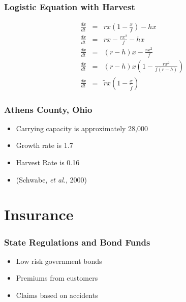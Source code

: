 \begin{frame}
    \frametitle{Logistic Equation with Harvest}
	\vspace{-1cm}
	\begin{eqnarray*}
		\frac{dx}{dt} &=& rx \left( 1-\frac{x}{f} \right) -hx\\
		\frac{dx}{dt} &=& rx-\frac{rx^{2}}{f}-hx\\
		\frac{dx}{dt} &=& (r-h)x-\frac{rx^{2}}{f}\\
		\frac{dx}{dt} &=& (r-h)x \left(1-\frac{rx^{2}}{f(r-h)} \right)\\
		\frac{dx}{dt} &=& \tilde{r}x \left( 1-\frac{x}{\tilde{f}} \right)		
	\end{eqnarray*}
\end{frame}

\begin{frame}
    \frametitle{Athens County, Ohio}
	\begin{itemize}
		\item Carrying capacity is approximately 28,000
		\item Growth rate is 1.7
		\item Harvest Rate is 0.16
		\item (Schwabe, \emph{et al.}, 2000)
	\end{itemize}
\end{frame}






\section{Insurance}

\begin{frame}
    \frametitle{State Regulations and Bond Funds}
	\begin{itemize}
		\item Low risk government bonds
		\item Premiums from customers
		\item Claims based on accidents
	\end{itemize}
\end{frame}